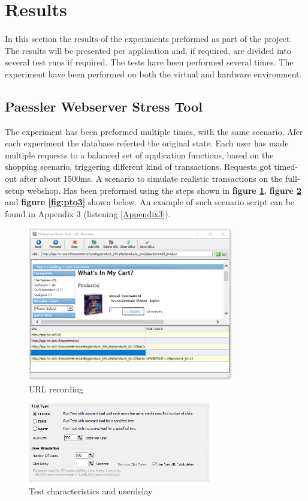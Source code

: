 \section{Results}
\paragraph{}
In this section the results of the experiments preformed as part of the project. The results will be presented per application and, if required, are divided into several test runs if required. The tests have been performed several times. The experiment have been performed on both the virtual and hardware environment.

\subsection{Paessler Webserver Stress Tool}
The experiment has been preformed multiple times, with the same scenario. Afer each experiment the database referted the original state. Each user has made multiple requests to a balanced set of application functions, based on the shopping scenario, triggering different kind of transactions. Requests got timed-out after about 1500ms. A scenario to simulate realistic transactions on the full-setup webshop. Has been preformed using the steps shown in \textbf{figure \ref{fig:pto1}}, \textbf{figure \ref{fig:pto2}} and \textbf{figure \ref{fig:pto3}} shown below. An example of such scenario script can be found in Appendix 3 (listening \ref{Appendix3}).

 \begin{figure}[H]
    \centering
    \includegraphics[width=9cm]{Pictures/pto01.PNG}
    \caption{URL recording}
    \label{fig:pto1}
\end{figure}

 \begin{figure}[H]
    \centering
    \includegraphics[width=8cm]{Pictures/pto02.PNG}
    \caption{Test characteristics and userdelay}
    \label{fig:pto2}
\end{figure}


